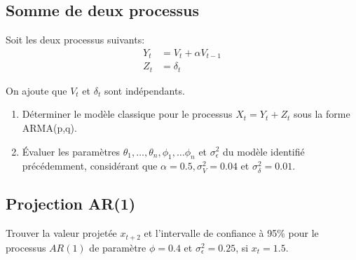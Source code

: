 \documentclass[11pt,english,francais]{article}
\begin{document}
\subsection{Somme de deux processus}

Soit les deux processus suivants:
\begin{align*}
Y_t &= V_t + \alpha V_{t-1} \\
Z_t &= \delta_t
\end{align*}

On ajoute que $V_t$ et $\delta_t$ sont indépendants.

\begin{enumerate}
\item Déterminer le modèle classique pour le processus $X_t = Y_t + Z_t$ sous la forme ARMA(p,q).
\item Évaluer les paramètres $\theta_1,\ldots,\theta_n, \phi_1, \ldots \phi_n$ et $\sigma^2_{\epsilon}$ du modèle identifié précédemment, considérant que $\alpha=0.5, \sigma^2_{V}=0.04$ et $\sigma^2_{\delta}=0.01$.
\end{enumerate}

\subsection{Projection AR(1)}

Trouver la valeur projetée $x_{t+2}$ et l'intervalle de confiance à 95\% pour le processus $AR(1)$ de paramètre $\phi=0.4$ et $\sigma^2_{\epsilon}=0.25$, si $x_t=1.5$.

\clearpage


\end{document}
